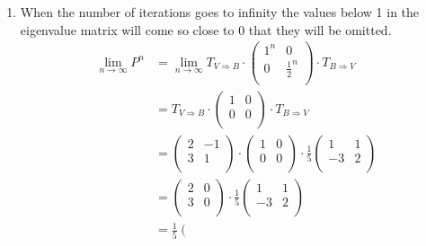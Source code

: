 \documentclass[a4paper]{article}
\begin{document}
\begin{enumerate}
\begin{align*}
\begin{array}{cc}
    0 & 5 \\
    \end{array}
    \right)
  \end{align*}
  \item When the number of iterations goes to infinity the values below 1 in the eigenvalue matrix will come so close to 0 that they will be omitted.
  \begin{align*}
    \lim_{n\to\infty} P^n &= \lim_{n\to\infty} T_{V \Rightarrow B} \cdot
    \left(
    \begin{array}{cc}
    1^n & 0 \\
    0 & \frac{1}{2}^n \\
    \end{array}
    \right) \cdot T_{B \Rightarrow V} \\
    &= T_{V \Rightarrow B} \cdot
    \left(
    \begin{array}{cc}
    1 & 0 \\
    0 & 0 \\
    \end{array}
    \right) \cdot T_{B \Rightarrow V} \\
    &=
    \left(
    \begin{array}{cc}
    2 & -1 \\
    3 & 1 \\
    \end{array}
    \right) \cdot
    \left(
    \begin{array}{cc}
    1 & 0 \\
    0 & 0 \\
    \end{array}
    \right) \cdot
    \frac{1}{5}
    \left(
    \begin{array}{cc}
    1 & 1 \\
    -3 & 2 \\
    \end{array}
    \right) \\
    &=
    \left(
    \begin{array}{cc}
    2 & 0 \\
    3 & 0 \\
    \end{array}
    \right) \cdot
    \frac{1}{5}
    \left(
    \begin{array}{cc}
    1 & 1 \\
    -3 & 2 \\
    \end{array}
    \right) \\
    &=
    \frac{1}{5}
    \left(
    \begin{array}{cc}

\end{array}
\end{align*}
\end{enumerate}
\end{document}

